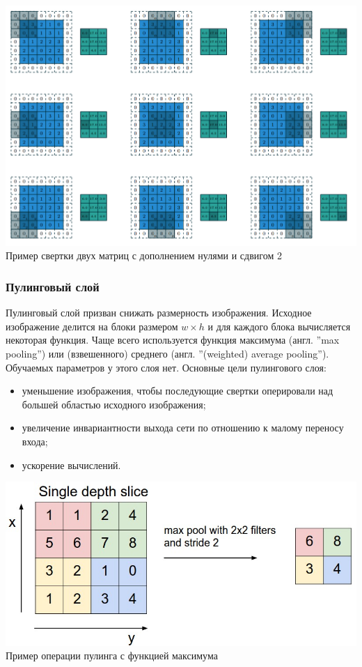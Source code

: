 \documentclass[12pt, a4paper, titlepage]{extreport}
\begin{document}
	\begin{center} 
		\includegraphics[scale=0.9]{Padding.png}\\
		Пример свертки двух матриц с дополнением нулями и сдвигом 2
	\end{center}
	\subsubsection*{Пулинговый слой}
	Пулинговый слой призван снижать размерность изображения. Исходное изображение делится на блоки размером $w\times h$ и для каждого блока вычисляется некоторая функция. Чаще всего используется функция максимума (англ. ''max pooling'') или (взвешенного) среднего (англ. ''(weighted) average pooling''). Обучаемых параметров у этого слоя нет. Основные цели пулингового слоя:
	\begin{itemize}
	\item  уменьшение изображения, чтобы последующие свертки оперировали над большей областью исходного изображения;
	\item увеличение инвариантности выхода сети по отношению к малому переносу входа;
	\item ускорение вычислений.
	\end{itemize}
	\begin{center} 
		\includegraphics[scale=0.5]{Maxpool.jpeg}\\
		Пример операции пулинга с функцией максимума
	\end{center}
\end{document}
